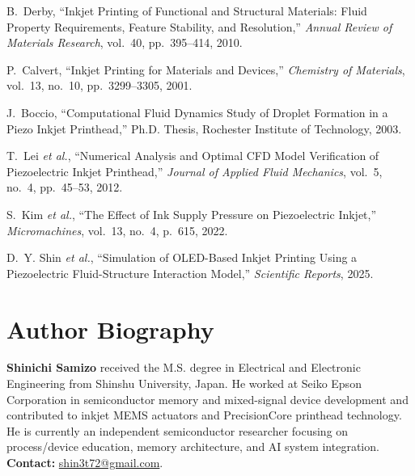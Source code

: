 \documentclass[conference]{IEEEtran}
\begin{document}
\begin{thebibliography}{99}
B.~Derby, ``Inkjet Printing of Functional and Structural Materials: Fluid Property Requirements, Feature Stability, and Resolution,'' \emph{Annual Review of Materials Research}, vol.~40, pp.~395--414, 2010.

P.~Calvert, ``Inkjet Printing for Materials and Devices,'' \emph{Chemistry of Materials}, vol.~13, no.~10, pp.~3299--3305, 2001.

J.~Boccio, ``Computational Fluid Dynamics Study of Droplet Formation in a Piezo Inkjet Printhead,'' Ph.D. Thesis, Rochester Institute of Technology, 2003.

T.~Lei \emph{et al.}, ``Numerical Analysis and Optimal CFD Model Verification of Piezoelectric Inkjet Printhead,'' \emph{Journal of Applied Fluid Mechanics}, vol.~5, no.~4, pp.~45--53, 2012.

S.~Kim \emph{et al.}, ``The Effect of Ink Supply Pressure on Piezoelectric Inkjet,'' \emph{Micromachines}, vol.~13, no.~4, p.~615, 2022.

D.~Y. Shin \emph{et al.}, ``Simulation of OLED-Based Inkjet Printing Using a Piezoelectric Fluid-Structure Interaction Model,'' \emph{Scientific Reports}, 2025.
\end{thebibliography}

\section*{Author Biography}
\textbf{Shinichi Samizo} received the M.S. degree in Electrical and Electronic Engineering from Shinshu University, Japan. He worked at Seiko Epson Corporation in semiconductor memory and mixed-signal device development and contributed to inkjet MEMS actuators and PrecisionCore printhead technology. He is currently an independent semiconductor researcher focusing on process/device education, memory architecture, and AI system integration. \textbf{Contact:} \href{mailto:shin3t72@gmail.com}{shin3t72@gmail.com}.
\end{document}
